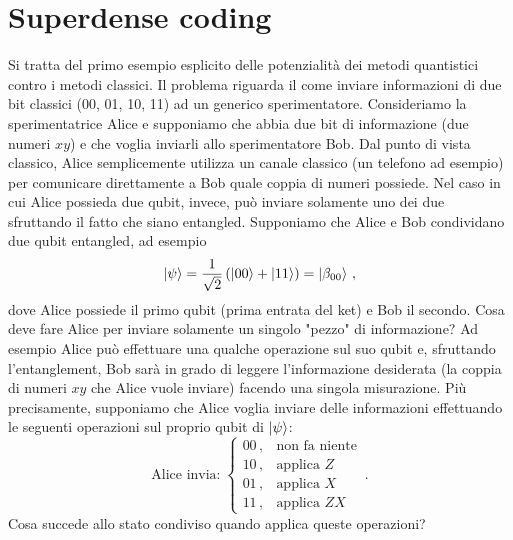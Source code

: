 \section{Superdense coding}
Si tratta del primo esempio esplicito delle potenzialità dei metodi quantistici contro i metodi classici. Il problema riguarda il come inviare informazioni di due bit classici (00, 01, 10, 11) ad un generico sperimentatore. Consideriamo la sperimentatrice Alice e supponiamo che abbia due bit di informazione (due numeri $xy$) e che voglia inviarli allo sperimentatore Bob. Dal punto di vista classico, Alice semplicemente utilizza un canale classico (un telefono ad esempio) per comunicare direttamente a Bob quale coppia di numeri possiede. Nel caso in cui Alice possieda due qubit, invece, può inviare solamente uno dei due sfruttando il fatto che siano entangled. Supponiamo che Alice e Bob condividano due qubit entangled, ad esempio
\begin{equation*}
    \ket{\psi} = \frac{1}{\sqrt{2}} \left( \ket{00} + \ket{11} \right) = \ket{\beta_{00}} \, ,
\end{equation*}
dove Alice possiede il primo qubit (prima entrata del ket) e Bob il secondo. Cosa deve fare Alice per inviare solamente un singolo "pezzo" di informazione? Ad esempio Alice può effettuare una qualche operazione sul suo qubit e, sfruttando l'entanglement, Bob sarà in grado di leggere l'informazione desiderata (la coppia di numeri $xy$ che Alice vuole inviare) facendo una singola misurazione. Più precisamente, supponiamo che Alice voglia inviare delle informazioni effettuando le seguenti operazioni sul proprio qubit di $\ket{\psi}$:
\begin{equation*}
    \text{Alice invia:} \; 
    \begin{cases}
        00 \, , &\text{non fa niente} \\
        10 \, , &\text{applica } Z \\
        01 \, , &\text{applica } X \\
        11 \, , &\text{applica } ZX
    \end{cases} \, .
\end{equation*}
Cosa succede allo stato condiviso quando applica queste operazioni? 
